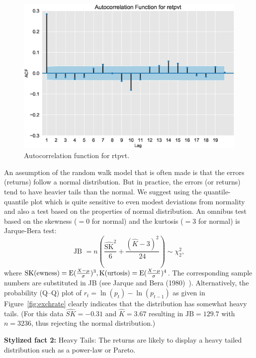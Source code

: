 	\begin{figure}[!ht]
	\centering
	\includegraphics[width=\textwidth]{chapters/chapter_uvts/figures/Sec2-4Fig5.eps}
	\caption{Autocorrelation function for rtpvt. \label{fig:autocorrtpvt}}
	\end{figure}
An assumption of the random walk model that is often made is that the errors (returns)
follow a normal distribution. But in practice, the errors (or returns) tend to have heavier tails than the normal. We suggest using the quantile-quantile plot which is quite sensitive to even modest deviations from normality and also a test based on the properties of normal distribution. An omnibus test based on the skewness ($=0$ for normal) and the kurtosis ($=3$ for normal) is Jarque-Bera test:
	\begin{equation} \label{eqn:2JB}
	\text{JB }= n \left( \frac{\widehat{\text{SK}}^2}{6} + \frac{(\hat{K} - 3)^2}{24} \right) \sim \chi_2^2,
	\end{equation}
where $\text{SK} \text{(ewness)}= \operatorname{E}( \frac{X-\mu}{\sigma} )^3, \text{K} \text{(urtosis)} = \operatorname{E}( \frac{X-\mu}{\sigma} )^4$. The corresponding sample numbers are substituted in JB (see Jarque and Bera (1980)~\cite{jarque80}). Alternatively, the probability (Q--Q) plot of $r_t = \ln{(p_t)} - \ln{(p_{t-1})}$ as given in Figure~\ref{fig:exchrate} clearly indicates that the distribution has somewhat heavy tails. (For this data $\widehat{SK} = -0.31$ and $\hat{K} = 3.67$ resulting in $\text{JB}= 129.7$ with $n= 3236$, thus rejecting the normal distribution.) \twomedskip


\noindent\textbf{Stylized fact 2:} Heavy Tails: The returns are likely to display a heavy
tailed distribution such as a power-law or Pareto. \twomedskip


